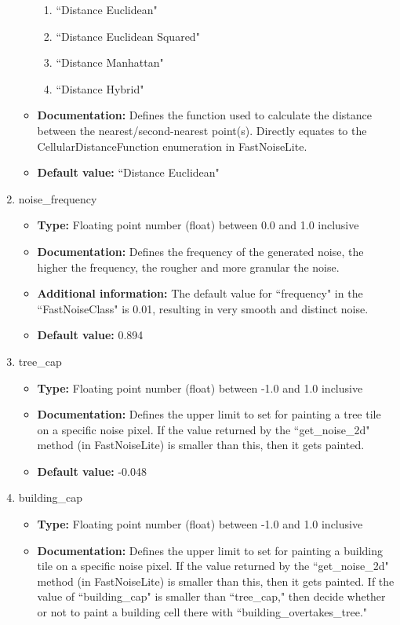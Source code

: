 \begin{enumerate}
\begin{itemize}
        \begin{enumerate}
            \item ``Distance Euclidean"
            \item ``Distance Euclidean Squared"
            \item ``Distance Manhattan"
            \item ``Distance Hybrid"
        \end{enumerate}
        \item \textbf{Documentation:} Defines the function used to calculate the distance between the nearest/second-nearest point(s). Directly equates to the CellularDistanceFunction enumeration in FastNoiseLite.
        \item \textbf{Default value:} ``Distance Euclidean"
    \end{itemize}
    \item noise\_frequency
    \begin{itemize}
        \item \textbf{Type:} Floating point number (float) between 0.0 and 1.0 inclusive
        \item \textbf{Documentation:} Defines the frequency of the generated noise, the higher the frequency, the rougher and more granular the noise.
        \item \textbf{Additional information:} The default value for ``frequency" in the ``FastNoiseClass" is 0.01, resulting in very smooth and distinct noise. 
        \item \textbf{Default value:} 0.894
    \end{itemize}
    \item tree\_cap
    \begin{itemize}
        \item \textbf{Type:} Floating point number (float) between -1.0 and 1.0 inclusive
        \item \textbf{Documentation:} Defines the upper limit to set for painting a tree tile on a specific noise pixel. If the value returned by the ``get\_noise\_2d" method (in FastNoiseLite) is smaller than this, then it gets painted.
        \item \textbf{Default value:} -0.048
    \end{itemize}
    \item building\_cap
    \begin{itemize}
        \item \textbf{Type:} Floating point number (float) between -1.0 and 1.0 inclusive
        \item \textbf{Documentation:} Defines the upper limit to set for painting a building tile on a specific noise pixel. If the value returned by the ``get\_noise\_2d" method (in FastNoiseLite) is smaller than this, then it gets painted. If the value of ``building\_cap" is smaller than ``tree\_cap," then decide whether or not to paint a building cell there with ``building\_overtakes\_tree."

\end{itemize}
\end{enumerate}
